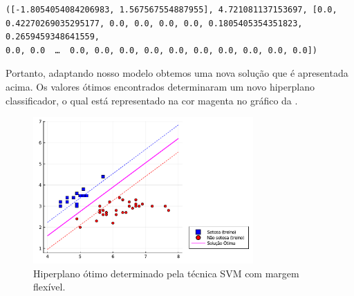 \documentclass[12pt,a4paper]{scrartcl}
\makeatletter
\theoremstyle{definition}%
\newcommand{\boxspacing}{\kern\kvtcb@left@rule\kern\kvtcb@boxsep}
\newcommand{\prompt}[4]{
        \ttfamily\llap{{\color{#2}[#3]:\hspace{3pt}#4}}\vspace{-\baselineskip}
    }
\makeatother
\begin{document}
            \begin{tcolorbox}[breakable, size=fbox, boxrule=.5pt, pad at break*=1mm, opacityfill=0]
\prompt{Out}{outcolor}{12}{\boxspacing}
\begin{Verbatim}[commandchars=\\\{\}]
([-1.8054054084206983, 1.567567554887955], 4.721081137153697, [0.0,
0.42270269035295177, 0.0, 0.0, 0.0, 0.0, 0.1805405354351823, 0.2659459348641559,
0.0, 0.0  …  0.0, 0.0, 0.0, 0.0, 0.0, 0.0, 0.0, 0.0, 0.0, 0.0])
\end{Verbatim}
\end{tcolorbox}
        
Portanto, adaptando nosso modelo obtemos uma nova solução que é
apresentada acima. Os valores ótimos encontrados determinaram um novo
hiperplano classificador, o qual está representado na cor magenta no
gráfico da .

{            %
    \begin{figure}
        \centering
        \includegraphics[width=0.75\textwidth]{Implementacao_de_SVM_em_Julia_TCC_files/Implementacao_de_SVM_em_Julia_TCC_26_0.pdf}
        \caption{Hiperplano ótimo determinado pela técnica SVM com margem flexível.}
        \label{fig:hiperplano_otimo_dados_iris_margem_flexível}
    \end{figure}
    }
    
\end{document}
